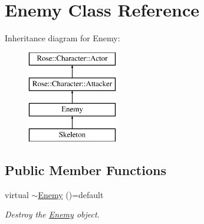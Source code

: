 \hypertarget{classEnemy}{}\section{Enemy Class Reference}
\label{classEnemy}
Inheritance diagram for Enemy\+:\begin{figure}[H]
\begin{center}
\leavevmode
\includegraphics[height=4.000000cm]{classEnemy}
\end{center}
\end{figure}
\subsection*{Public Member Functions}
\begin{DoxyCompactItemize}
\item 
virtual \mbox{\hyperlink{classEnemy_aafb628c66008e33afdd750e2f492bd98}{$\sim$\+Enemy}} ()=default
\begin{DoxyCompactList}\small\item\em Destroy the \mbox{\hyperlink{classEnemy}{Enemy}} object. \end{DoxyCompactList}\end{DoxyCompactItemize}
